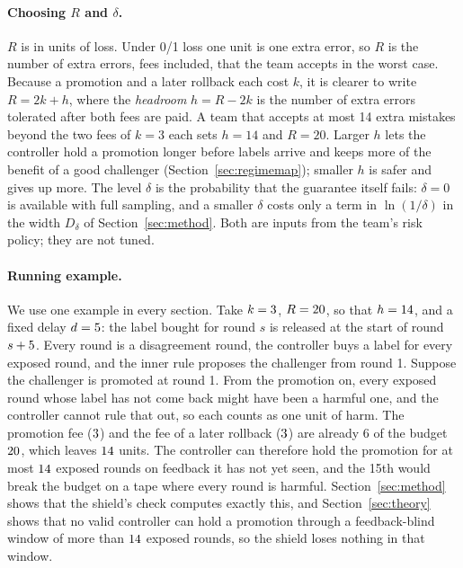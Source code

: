 \documentclass[10pt]{article}
\theoremstyle{plain}
\theoremstyle{definition}
\begin{document}
\paragraph{Choosing $R$ and $\delta$.}
$R$ is in units of loss. Under 0/1 loss one unit is one extra error, so $R$ is the number of extra errors, fees included, that the team accepts in the worst case. Because a promotion and a later rollback each cost $k$, it is clearer to write $R=2k+h$, where the \emph{headroom} $h=R-2k$ is the number of extra errors tolerated after both fees are paid. A team that accepts at most 14 extra mistakes beyond the two fees of $k=3$ each sets $h=14$ and $R=20$. Larger $h$ lets the controller hold a promotion longer before labels arrive and keeps more of the benefit of a good challenger (Section~\ref{sec:regimemap}); smaller $h$ is safer and gives up more. The level $\delta$ is the probability that the guarantee itself fails: $\delta=0$ is available with full sampling, and a smaller $\delta$ costs only a term in $\ln(1/\delta)$ in the width $D_\delta$ of Section~\ref{sec:method}. Both are inputs from the team's risk policy; they are not tuned.

\paragraph{Running example.}\label{par:example}
We use one example in every section. Take $k=3$, $R=20$, so that $h=14$, and a fixed delay $d=5$: the label bought for round $s$ is released at the start of round $s+5$. Every round is a disagreement round, the controller buys a label for every exposed round, and the inner rule proposes the challenger from round 1. Suppose the challenger is promoted at round 1. From the promotion on, every exposed round whose label has not come back might have been a harmful one, and the controller cannot rule that out, so each counts as one unit of harm. The promotion fee ($3$) and the fee of a later rollback ($3$) are already $6$ of the budget $20$, which leaves $14$ units. The controller can therefore hold the promotion for at most $14$ exposed rounds on feedback it has not yet seen, and the 15th would break the budget on a tape where every round is harmful. Section~\ref{sec:method} shows that the shield's check computes exactly this, and Section~\ref{sec:theory} shows that no valid controller can hold a promotion through a feedback-blind window of more than $14$ exposed rounds, so the shield loses nothing in that window.
\end{document}
